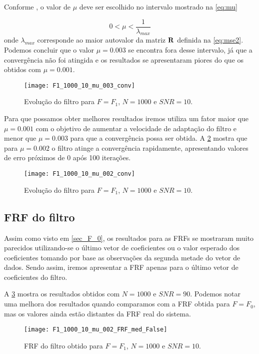 Conforme \citet{diniz1997adaptive}, o valor de $ \mu $ deve ser escolhido no intervalo mostrado na \cref{eq:mu}

\begin{equation}\label{eq:mu}
0 < \mu < \frac{1}{\lambda_{max}}
\end{equation}
onde $ \lambda_{max} $ corresponde ao maior autovalor da matriz $ {\bf R} $ definida na \cref{eq:mse2}. Podemos concluir que o valor $ \mu = 0.003 $ se encontra fora desse intervalo, já que a convergência não foi atingida e os resultados se apresentaram piores do que os obtidos com $ \mu=0.001 $. 

\begin{figure}
	\centering
	\texttt{[image: F1\_1000\_10\_mu\_003\_conv]}
	\caption{Evolução do filtro para $ F=F_1 $, $ N=1000 $ e $ SNR=10 $.}
	\label{fig:F1_1000_10_mu_003_conv}
\end{figure}

Para que possamos obter melhores resultados iremos utiliza um fator maior que $ \mu=0.001 $ com o objetivo de aumentar a velocidade de adaptação do filtro e menor que $ \mu=0.003 $ para que a convergência possa ser obtida. A \cref{fig:F1_1000_10_mu_002_conv} mostra que para $ \mu=0.002 $ o filtro atinge a convergência rapidamente, apresentando valores de erro próximos de 0 após 100 iterações.

\begin{figure}
	\centering
	\texttt{[image: F1\_1000\_10\_mu\_002\_conv]}
	\caption{Evolução do filtro para $ F=F_1 $, $ N=1000 $ e $ SNR=10 $.}
	\label{fig:F1_1000_10_mu_002_conv}
\end{figure}

\subsection{FRF do filtro}
Assim como visto em \ref{sec_F_0}, os resultados para as FRFs se mostraram muito parecidos utilizando-se o último vetor de coeficientes ou o valor esperado dos coeficientes tomando por base as observações da segunda metade do vetor de dados. Sendo assim, iremos apresentar a FRF apenas para o último vetor de coeficientes do filtro.

A \cref{fig:F1_1000_10_mu_002_FRF_med_False} mostra os resultados obtidos com $ N=1000 $ e $ SNR=90 $. Podemos notar uma melhora dos resultados quando comparamos com a FRF obtida para $ F=F_0 $, mas os valores ainda estão distantes da FRF real do sistema.

\begin{figure}
	\centering
	\texttt{[image: F1\_1000\_10\_mu\_002\_FRF\_med\_False]}
	\caption{FRF do filtro obtido para $ F=F_1 $, $ N=1000 $ e $ SNR=10 $.}
	\label{fig:F1_1000_10_mu_002_FRF_med_False}
\end{figure}

